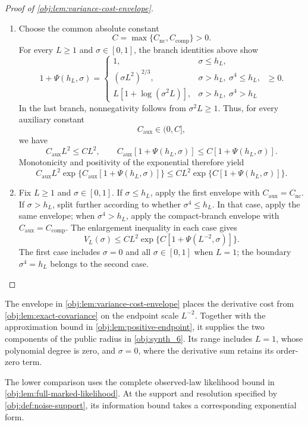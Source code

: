 \documentclass[11pt]{article}
\begin{document}
\begin{proof}[Proof of \cref{obj:lem:variance-cost-envelope}]
\begin{enumerate}
\item Choose the common absolute constant
\[
C=\max\{C_{\mathrm{nc}},C_{\mathrm{comp}}\}>0.
\]
For every \(L\ge1\) and \(\sigma\in[0,1]\), the branch identities above show
\[
1+\Psi(h_L,\sigma)
=
\begin{cases}
1,&\sigma\le h_L,\\
(\sigma L^2)^{2/3},&\sigma>h_L,\ \sigma^4\le h_L,\\
L[1+\log(\sigma^2L)],&\sigma>h_L,\ \sigma^4>h_L
\end{cases}
\ \ge0.
\]
In the last branch, nonnegativity follows from \(\sigma^2L\ge1\).
Thus, for every auxiliary constant
\[
C_{\mathrm{aux}}\in(0,C],
\]
we have
\[
C_{\mathrm{aux}}L^2\le CL^2,
\qquad
C_{\mathrm{aux}}[1+\Psi(h_L,\sigma)]
\le C[1+\Psi(h_L,\sigma)].
\]
Monotonicity and positivity of the exponential therefore yield
\[
C_{\mathrm{aux}}L^2
\exp\{C_{\mathrm{aux}}[1+\Psi(h_L,\sigma)]\}
\le
CL^2\exp\{C[1+\Psi(h_L,\sigma)]\}.
\]

\item Fix \(L\ge1\) and \(\sigma\in[0,1]\). If \(\sigma\le h_L\), apply the
first envelope with \(C_{\mathrm{aux}}=C_{\mathrm{nc}}\).
If \(\sigma>h_L\), split further according to whether
\(\sigma^4\le h_L\). In that case, apply the same envelope; when
\(\sigma^4>h_L\), apply the compact-branch envelope with
\(C_{\mathrm{aux}}=C_{\mathrm{comp}}\). The enlargement inequality in each
case gives
\[
V_L(\sigma)\le CL^2
\exp\{C[1+\Psi(L^{-2},\sigma)]\}.
\]
The first case includes \(\sigma=0\) and all \(\sigma\in[0,1]\) when
\(L=1\); the boundary \(\sigma^4=h_L\) belongs to the second case.
\end{enumerate}
\end{proof}

The envelope in \cref{obj:lem:variance-cost-envelope} places the derivative cost from \cref{obj:lem:exact-covariance} on the endpoint scale \(L^{-2}\). Together with the approximation bound in \cref{obj:lem:positive-endpoint}, it supplies the two components of the public radius in \cref{obj:synth_6}. Its range includes \(L=1\), whose polynomial degree is zero, and \(\sigma=0\), where the derivative sum retains its order-zero term.

The lower comparison uses the complete observed-law likelihood bound in \cref{obj:lem:full-marked-likelihood}. At the support and resolution specified by \cref{obj:def:noise-support}, its information bound takes a corresponding exponential form.
\end{document}
